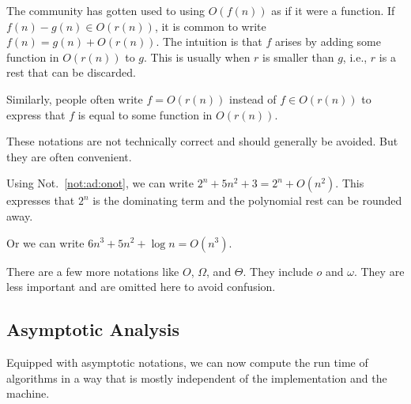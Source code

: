 
\begin{notation}\label{not:ad:onot}
The community has gotten used to using $O(f(n))$ as if it were a function.
If $f(n)-g(n)\in O(r(n))$, it is common to write $f(n)=g(n)+O(r(n))$.
The intuition is that $f$ arises by adding some function in $O(r(n))$ to $g$.
This is usually when $r$ is smaller than $g$, i.e., $r$ is a rest that can be discarded.

Similarly, people often write $f=O(r(n))$ instead of $f\in O(r(n))$ to express that $f$ is equal to some function in $O(r(n))$.
\medskip

These notations are not technically correct and should generally be avoided.
But they are often convenient.
\end{notation}

\begin{example}\label{ex:ad:onot2}
Using Not.~\ref{not:ad:onot}, we can write
 $2^n+5n^2+3=2^n+O(n^2)$.
This expresses that $2^n$ is the dominating term and the polynomial rest can be rounded away.

Or we can write $6n^3+5n^2+\log n=O(n^3)$.
\end{example}

\begin{remark}
There are a few more notations like $O$, $\Omega$, and $\Theta$.
They include $o$ and $\omega$.
They are less important and are omitted here to avoid confusion.
\end{remark}

\subsection{Asymptotic Analysis}\label{sec:ad:asympana}

Equipped with asymptotic notations, we can now compute the run time of algorithms in a way that is mostly independent of the implementation and the machine.

